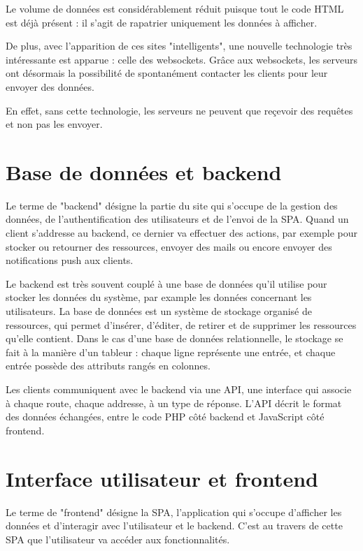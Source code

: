 \documentclass[
    iai, %
    eai, %
]{heig-tb}
\begin{document}
Le volume de données est considérablement réduit puisque tout le code HTML est déjà présent : il s'agit de rapatrier uniquement les données à afficher.

De plus, avec l'apparition de ces sites "intelligents", une nouvelle technologie très intéressante est apparue : celle des websockets.
Grâce aux websockets, les serveurs ont désormais la possibilité de spontanément contacter les clients pour leur envoyer des données.

En effet, sans cette technologie, les serveurs ne peuvent que reçevoir des requêtes et non pas les envoyer.

\section{Base de données et backend}

Le terme de "backend" désigne la partie du site qui s'occupe de la gestion des données, de l'authentification des utilisateurs et de l'envoi de la SPA.
Quand un client s'addresse au backend, ce dernier va effectuer des actions, par exemple pour stocker ou retourner des ressources, envoyer des mails ou encore envoyer des notifications push aux clients.

Le backend est très souvent couplé à une base de données qu'il utilise pour stocker les données du système, par example les données concernant les utilisateurs.
La base de données est un système de stockage organisé de ressources, qui permet d'insérer, d'éditer, de retirer et de supprimer les ressources qu'elle contient.
Dans le cas d'une base de données relationnelle, le stockage se fait à la manière d'un tableur : chaque ligne représente une entrée, et chaque entrée possède des attributs rangés en colonnes.

Les clients communiquent avec le backend via une API, une interface qui associe à chaque route, chaque addresse, à un type de réponse.
L'API décrit le format des données échangées, entre le code PHP côté backend et JavaScript côté frontend.


\section{Interface utilisateur et frontend}

Le terme de "frontend" désigne la SPA, l'application qui s'occupe d'afficher les données et d'interagir avec l'utilisateur et le backend.
C'est au travers de cette SPA que l'utilisateur va accéder aux fonctionnalités.
\end{document}
